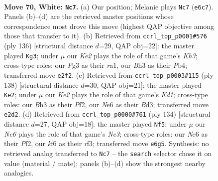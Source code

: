 \documentclass[11pt]{article}
\begin{document}
\clearpage

\begin{figure}[p]\centering
\begin{subfigure}{0.46\textwidth}\centering
\resizebox{\linewidth}{!}{%
\newchessgame
\chessboard[
  setfen={b7/P7/4Nk2/n7/1p3P2/6PB/4K2P/3R4 w - - 8 70},
  showmover=false,
  pgfstyle=straightmove, color=movearrow, markmove={e6-c7}
]}
\caption{}
\end{subfigure}\hfill
\begin{subfigure}{0.46\textwidth}\centering
\resizebox{\linewidth}{!}{%
\newchessgame
\chessboard[
  setfen={5R2/8/P2k4/1pN4b/1P2P3/7K/8/r7 w - - 1 69},
  showmover=false,
  pgfstyle=straightmove, color=movearrow, markmove={h3-g3}
]}
\caption{}
\end{subfigure}
\\[4pt]
\begin{subfigure}{0.46\textwidth}\centering
\resizebox{\linewidth}{!}{%
\newchessgame
\chessboard[
  setfen={8/8/7p/b5p1/3k2P1/3B3P/2P2P2/3K4 w - - 55 70},
  showmover=false,
  pgfstyle=straightmove, color=movearrow, markmove={d1-e2}
]}
\caption{}
\end{subfigure}\hfill
\begin{subfigure}{0.46\textwidth}\centering
\resizebox{\linewidth}{!}{%
\newchessgame
\chessboard[
  setfen={8/8/pB2k3/6K1/bP4P1/P3Nr2/5P2/8 w - - 21 68},
  showmover=false,
  pgfstyle=straightmove, color=movearrow, markmove={e3-f5}
]}
\caption{}
\end{subfigure}
\caption{\textbf{Move 70, White: \texttt{Nc7}.} (a) Our position; Melanie plays \texttt{Nc7} (\texttt{e6c7}). Panels (b)--(d) are the retrieved master positions whose correspondence most drove this move (highest QAP objective among those that transfer to it). (b) Retrieved from \texttt{ccrl\_top\_p0001\#576} (ply 136) [structural distance $d$=29, QAP obj=22]: the master played \texttt{Kg3}; under $\mu$ our \emph{Ke2} plays the role of that game's \emph{Kh3}; cross-type roles: our \emph{P}g3 as their \emph{r}a1, our \emph{B}h3 as their \emph{P}b4; transferred move \texttt{e2f2}. (c) Retrieved from \texttt{ccrl\_top\_p0003\#115} (ply 138) [structural distance $d$=30, QAP obj=21]: the master played \texttt{Ke2}; under $\mu$ our \emph{Ke2} plays the role of that game's \emph{Kd1}; cross-type roles: our \emph{B}h3 as their \emph{P}f2, our \emph{N}e6 as their \emph{B}d3; transferred move \texttt{e2d2}. (d) Retrieved from \texttt{ccrl\_top\_p0000\#761} (ply 134) [structural distance $d$=27, QAP obj=18]: the master played \texttt{Nf5}; under $\mu$ our \emph{Ne6} plays the role of that game's \emph{Ne3}; cross-type roles: our \emph{N}e6 as their \emph{P}f2, our \emph{k}f6 as their \emph{r}f3; transferred move \texttt{e6g5}. Synthesis: no retrieved analog transferred to \texttt{Nc7} -- the \texttt{search} selector chose it on value (material / mate); panels (b)--(d) show the strongest nearby analogies.}
\label{fig:thought-m138}
\end{figure}
\end{document}
